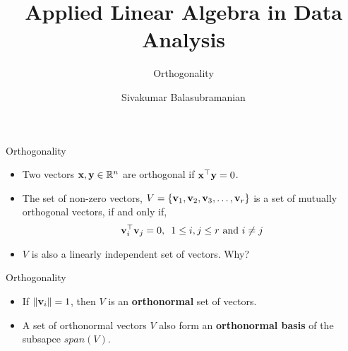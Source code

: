 \documentclass[aspectratio=169]{beamer}
\title{Applied Linear Algebra in Data Analysis}
\subtitle{Orthogonality}
\author{Sivakumar Balasubramanian}
\institute[Christian Medical College] %
{
  \inst{}%
  Department of Bioengineering\\
  Christian Medical College, Bagayam\\
  Vellore 632002
}
\date{}
\let\olditem\item
\renewcommand{\item}{\setlength{\itemsep}{\fill}\olditem}
\def\mf{\ensuremath\mathbf}
\def\mb{\ensuremath\mathbb}
\def\lV{\ensuremath\left\lVert}
\def\rV{\ensuremath\right\rVert}
\begin{document}
\begin{frame}
  \titlepage
\end{frame}



\begin{frame}[t]{Orthogonality}
\begin{itemize}
\item Two vectors $\mf{x}, \mf{y} \in \mb{R}^n$ are orthogonal if $\mf{x}^\top\mf{y} = 0$.
\begin{center}
\end{center}

\item The set of non-zero vectors, $V = \left\{\mf{v}_1, \mf{v}_2, \mf{v}_3, \ldots, \mf{v}_r\right\}$ is a set of mutually orthogonal vectors, if and only if,
\[ \mf{v}_i^\top\mf{v}_j = 0, \,\,\, 1 \leq i, j \leq r \text{ and } i \neq j \]

\item $V$ is also a linearly independent set of vectors. Why?

\end{itemize}
\end{frame}


\begin{frame}[t]{Orthogonality}
\begin{itemize}

\item If $\lV \mf{v}_i \rV = 1$, then $V$ is an \textbf{orthonormal} set of vectors.

\item A set of orthonormal vectors $V$ also form an \textbf{orthonormal basis} of the subsapce $span \left(V\right)$.

\end{itemize}
\end{frame}
\end{document}
